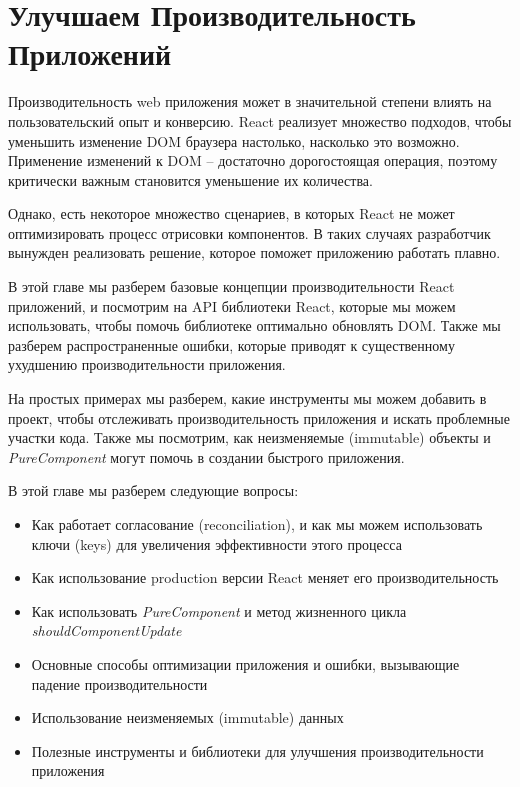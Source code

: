 \chapter{Улучшаем Производительность Приложений}

Производительность web приложения может в значительной степени влиять на пользовательский опыт и конверсию. React реализует множество подходов, чтобы уменьшить изменение DOM браузера настолько, насколько это возможно. Применение изменений к DOM -- достаточно дорогостоящая операция, поэтому критически важным становится уменьшение их количества.

Однако, есть некоторое множество сценариев, в которых React не может оптимизировать процесс отрисовки компонентов. В таких случаях разработчик вынужден реализовать решение, которое поможет приложению работать плавно.

В этой главе мы разберем базовые концепции производительности React приложений, и посмотрим на API библиотеки React, которые мы можем использовать, чтобы помочь библиотеке оптимально обновлять DOM. Также мы разберем распространенные ошибки, которые приводят к существенному ухудшению производительности приложения.

На простых примерах мы разберем, какие инструменты мы можем добавить в проект, чтобы отслеживать производительность приложения и искать проблемные участки кода. Также мы посмотрим, как неизменяемые (immutable) объекты и \textit{PureComponent} могут помочь в создании быстрого приложения.

В этой главе мы разберем следующие вопросы:

\begin{itemize}
	\item Как работает согласование (reconciliation), и как мы можем использовать ключи (keys) для увеличения эффективности этого процесса
	\item Как использование production версии React меняет его производительность
	\item Как использовать \textit{PureComponent} и метод жизненного цикла \textit{shouldComponentUpdate}
	\item Основные способы оптимизации приложения и ошибки, вызывающие падение производительности
	\item Использование неизменяемых (immutable) данных
	\item Полезные инструменты и библиотеки для улучшения производительности приложения
\end{itemize}

